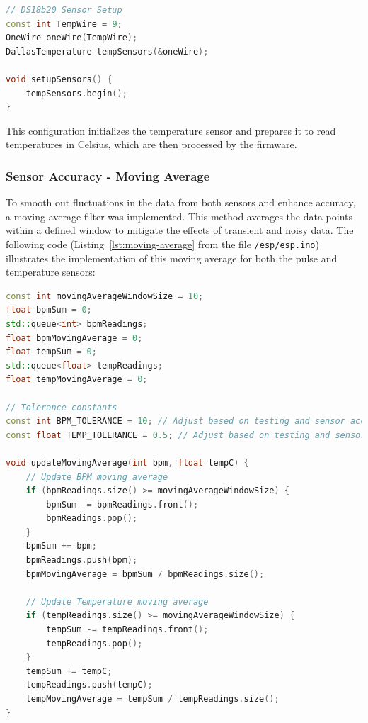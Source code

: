 \begin{lstlisting}[language=C++, caption=Code for DS18B20 Integration, label=lst:temp-sensor]
// DS18b20 Sensor Setup
const int TempWire = 9;
OneWire oneWire(TempWire);
DallasTemperature tempSensors(&oneWire);

void setupSensors() {
    tempSensors.begin();
}
\end{lstlisting}

This configuration initializes the temperature sensor and prepares it to read temperatures in Celsius, which are then processed by the firmware.

\subsubsection{Sensor Accuracy - Moving Average}

To smooth out fluctuations in the data from both sensors and enhance accuracy, a moving average filter was implemented. This method averages the data points within a defined window to mitigate the effects of transient and noisy data. The following code (Listing~\ref{lst:moving-average} from the file \texttt{/esp/esp.ino}) illustrates the implementation of this moving average for both the pulse and temperature sensors:

\begin{lstlisting}[language=C++, caption=Implementation of Moving Average to increase sensor accuracy, label=lst:moving-average]
const int movingAverageWindowSize = 10;
float bpmSum = 0;
std::queue<int> bpmReadings;
float bpmMovingAverage = 0;
float tempSum = 0;
std::queue<float> tempReadings;
float tempMovingAverage = 0;

// Tolerance constants
const int BPM_TOLERANCE = 10; // Adjust based on testing and sensor accuracy
const float TEMP_TOLERANCE = 0.5; // Adjust based on testing and sensor accuracy

void updateMovingAverage(int bpm, float tempC) {
    // Update BPM moving average
    if (bpmReadings.size() >= movingAverageWindowSize) {
        bpmSum -= bpmReadings.front();
        bpmReadings.pop();
    }
    bpmSum += bpm;
    bpmReadings.push(bpm);
    bpmMovingAverage = bpmSum / bpmReadings.size();

    // Update Temperature moving average
    if (tempReadings.size() >= movingAverageWindowSize) {
        tempSum -= tempReadings.front();
        tempReadings.pop();
    }
    tempSum += tempC;
    tempReadings.push(tempC);
    tempMovingAverage = tempSum / tempReadings.size();
}
\end{lstlisting}

